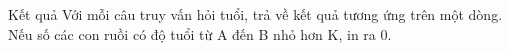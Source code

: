 Kết quả
Với mỗi câu truy vấn hỏi tuổi, trả về kết quả tương ứng trên một dòng. Nếu số các con ruồi có độ tuổi từ A đến B nhỏ hơn K, in ra 0.